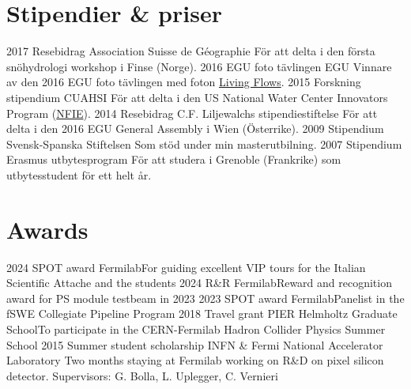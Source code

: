 \ifswedish
  \section{Stipendier \& priser}
    \position
      {2017}
      {Resebidrag}
      {Association Suisse de Géographie}
      {För att delta i den första snöhydrologi workshop i Finse (Norge).}
    \position
      {2016}
      {EGU foto tävlingen}
      {EGU}
      {Vinnare av den 2016 EGU foto tävlingen med foton \href{https://blogs.egu.eu/geolog/2016/08/29/imaggeo-on-mondays-living-flows/}{Living Flows}.}
    \position
      {2015}
      {Forskning stipendium}
      {CUAHSI}
      {För att delta i den US National Water Center Innovators Program  (\href{https://www.cuahsi.org/education/summerinstitute/}{NFIE}).}
    \position
      {2014}
      {Resebidrag}
      {C.F. Liljewalchs stipendiestiftelse}
      {För att delta i den 2016 EGU General Assembly i Wien (Österrike).}
    \position
      {2009}
      {Stipendium}
      {Svensk-Spanska Stiftelsen}
      {Som stöd under min masterutbilning.}
    \position
      {2007}
      {Stipendium}
      {Erasmus utbytesprogram}
      {För att studera i Grenoble (Frankrike) som utbytesstudent för ett helt år.}
\else
  \section{Awards}
    \ifacademic
    \position  
        {2024}
        {SPOT award}
        {Fermilab}{For guiding excellent VIP tours for the Italian Scientific Attache and the students} 
     \position  
        {2024}
        {R\&R}
        {Fermilab}{Reward and recognition award for PS module testbeam in 2023} 
      \position  
        {2023}
        {SPOT award}
        {Fermilab}{Panelist in the fSWE Collegiate Pipeline Program} 
      \position  
        {2018}
        {Travel grant}
        {PIER Helmholtz Graduate School}{To participate in the CERN-Fermilab Hadron Collider Physics Summer School}      
       \position
        {2015}
        {Summer student scholarship}
        {INFN \& Fermi National Accelerator Laboratory} 
        {Two months staying at Fermilab working on R\&D on pixel silicon detector. \newline Supervisors: G. Bolla, L. Uplegger, C. Vernieri}
    \fi
\fi
